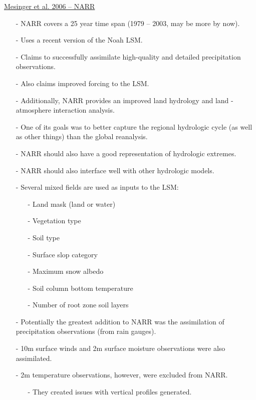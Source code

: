 \documentclass[12pt, letterpaper]{article}
\begin{document}
    \underline{Mesinger et al. 2006 -- NARR}
    \begin{itemize}
    	\item[-] NARR covers a 25 year time span (1979 -- 2003, may be more by now).
    	\item[-] Uses a recent version of the Noah LSM.
    	\item[-] Claims to successfully assimilate high-quality and detailed precipitation observations.
    	\item[-] Also claims improved forcing to the LSM.
    	\item[-] Additionally, NARR provides an improved land hydrology and land - atmosphere interaction
    	         analysis.
    	\item[-] One of its goals was to better capture the regional hydrologic cycle (as well as other
    	         things) than the global reanalysis.
    	\item[-] NARR should also have a good representation of hydrologic extremes.
    	\item[-] NARR should also interface well with other hydrologic models.
    	\item[-] Several mixed fields are used as inputs to the LSM:
    	\begin{itemize}
    		\item[-] Land mask (land or water)
    		\item[-] Vegetation type
    		\item[-] Soil type
    		\item[-] Surface slop category
    		\item[-] Maximum snow albedo
    		\item[-] Soil column bottom temperature
    		\item[-] Number of root zone soil layers
    	\end{itemize}
        \item[-] Potentially the greatest addition to NARR was the assimilation of precipitation 
                 observations (from rain gauges).
        \item[-] 10m surface winds and 2m surface moisture observations were also assimilated.
        \item[-] 2m temperature observations, however, were excluded from NARR.
        \begin{itemize}
        	\item[-] They created issues with vertical profiles generated.
        \end{itemize}

\end{itemize}
\end{document}
